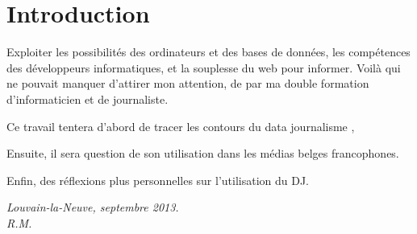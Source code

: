 
\chapter*{Introduction}

Exploiter les possibilités des ordinateurs et des bases de données, les compétences des développeurs informatiques,
et la souplesse du web pour informer. Voilà qui ne pouvait manquer d'attirer mon attention, de par ma double formation d'informaticien et de journaliste.

Ce travail tentera d'abord de tracer les contours du  \og data journalisme \fg, 


Ensuite, il sera question de son utilisation dans les médias belges francophones.

Enfin, des réflexions plus personnelles sur l'utilisation du DJ.








\flushright
\em
Louvain-la-Neuve, septembre 2013. 
\\ R.M.
\em
\flushleft
